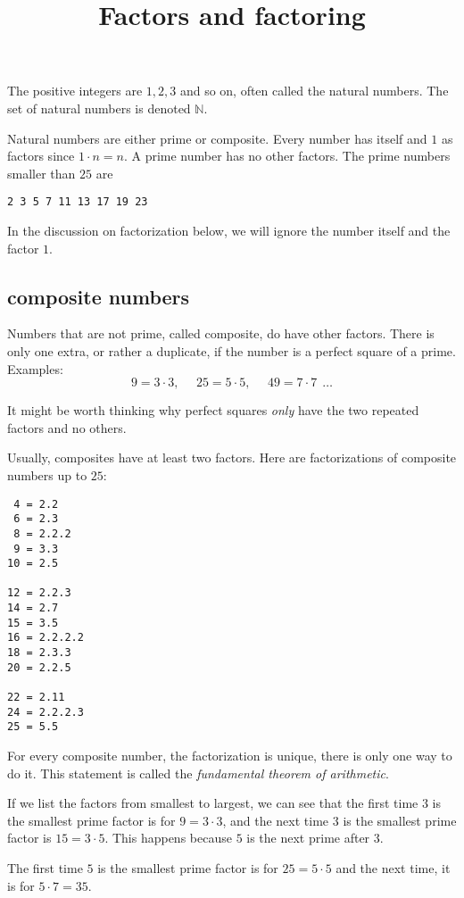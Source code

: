 \documentclass[11pt, oneside]{article}
\title{Factors and factoring}
\date{}
\begin{document}
\maketitle
\Large

The positive integers are $1, 2, 3$ and so on, often called the natural numbers.  The set of natural numbers is denoted $\mathbb{N}$.  

Natural numbers are either prime or composite.  Every number has itself and $1$ as factors since $1 \cdot n = n$.  A prime number has no other factors.  The prime numbers smaller than $25$ are
\begin{verbatim}
2 3 5 7 11 13 17 19 23 
\end{verbatim}
In the discussion on factorization below, we will ignore the number itself and the factor $1$. 

\subsection*{composite numbers}

Numbers that are not prime, called composite, do have other factors.  There is only one extra, or rather a duplicate, if the number is a perfect square of a prime.  Examples:
\[ 9 = 3 \cdot 3, \ \ \ \ \ \ 25 = 5 \cdot 5, \ \ \ \ \ \  49 = 7 \cdot 7 \ \ \dots \]

It might be worth thinking why perfect squares \emph{only} have the two repeated factors and no others.

Usually, composites have at least two factors.  Here are factorizations of composite numbers up to $25$:

\begin{verbatim}
 4 = 2.2
 6 = 2.3
 8 = 2.2.2
 9 = 3.3
10 = 2.5

12 = 2.2.3
14 = 2.7
15 = 3.5
16 = 2.2.2.2
18 = 2.3.3
20 = 2.2.5

22 = 2.11
24 = 2.2.2.3
25 = 5.5
\end{verbatim}

For every composite number, the factorization is unique, there is only one way to do it.  This statement is called the \emph{fundamental theorem of arithmetic}.

If we list the factors from smallest to largest, we can see that the first time $3$ is the smallest prime factor is for $9 = 3 \cdot 3$, and the next time $3$ is the smallest prime factor is $15 = 3 \cdot 5$.  This happens because $5$ is the next prime after $3$.

The first time $5$ is the smallest prime factor is for $25 = 5 \cdot 5$ and the next time, it is for $5 \cdot 7 = 35$.
\end{document}
